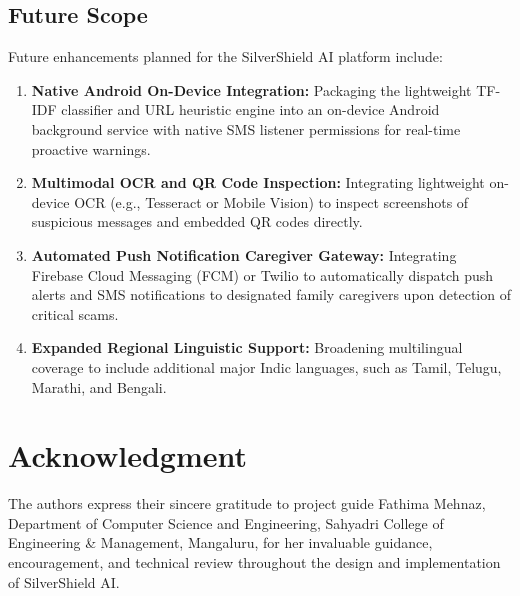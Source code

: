 \documentclass[conference]{IEEEtran}
\begin{document}
\subsection{Future Scope}
Future enhancements planned for the SilverShield AI platform include:
\begin{enumerate}
    \item \textbf{Native Android On-Device Integration:} Packaging the lightweight TF-IDF classifier and URL heuristic engine into an on-device Android background service with native SMS listener permissions for real-time proactive warnings.
    \item \textbf{Multimodal OCR and QR Code Inspection:} Integrating lightweight on-device OCR (e.g., Tesseract or Mobile Vision) to inspect screenshots of suspicious messages and embedded QR codes directly.
    \item \textbf{Automated Push Notification Caregiver Gateway:} Integrating Firebase Cloud Messaging (FCM) or Twilio to automatically dispatch push alerts and SMS notifications to designated family caregivers upon detection of critical scams.
    \item \textbf{Expanded Regional Linguistic Support:} Broadening multilingual coverage to include additional major Indic languages, such as Tamil, Telugu, Marathi, and Bengali.
\end{enumerate}

\section*{Acknowledgment}
The authors express their sincere gratitude to project guide Fathima Mehnaz, Department of Computer Science and Engineering, Sahyadri College of Engineering \& Management, Mangaluru, for her invaluable guidance, encouragement, and technical review throughout the design and implementation of SilverShield AI.



\end{document}
